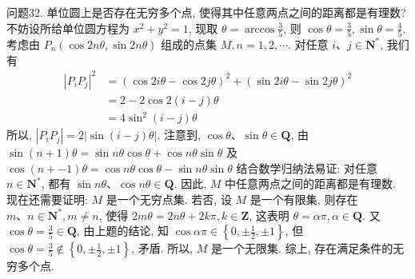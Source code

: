 问题32. 单位圆上是否存在无穷多个点, 使得其中任意两点之间的距离都是有理数?
不妨设所给单位圆方程为 $x^2+y^2=1$, 现取 $\theta=\arccos \frac{3}{5}$, 则 $\cos \theta= \frac{3}{5}, \sin \theta=\frac{4}{5}$. 考虑由 $P_n(\cos 2 n \theta, \sin 2 n \theta)$ 组成的点集 $M, n=1,2, \cdots$.
对任意 $i 、 j \in \mathbf{N}^*$, 我们有
$$
\begin{aligned}
\left|P_i P_j\right|^2 & =(\cos 2 i \theta-\cos 2 j \theta)^2+(\sin 2 i \theta-\sin 2 j \theta)^2 \\
& =2-2 \cos 2(i-j) \theta \\
& =4 \sin ^2(i-j) \theta
\end{aligned}
$$
所以, $\left|P_i P_j\right|=2|\sin (i-j) \theta|$.
注意到, $\cos \theta 、 \sin \theta \in \mathbf{Q}$, 由 $\sin (n+1) \theta=\sin n \theta \cos \theta+\cos n \theta \sin \theta$ 及 $\cos (n+-1) \theta=\cos n \theta \cos \theta-\sin n \theta \sin \theta$ 结合数学归纳法易证: 对任意 $n \in \mathbf{N}^*$, 都有 $\sin n \theta 、 \cos n \theta \in \mathbf{Q}$. 因此, $M$ 中任意两点之间的距离都是有理数.
现在还需要证明: $M$ 是一个无穷点集.
若否, 设 $M$ 是一个有限集, 则存在 $m 、 n \in \mathbf{N}^*, m \neq n$, 使得 $2 m \theta=2 n \theta+ 2 k \pi, k \in \mathbf{Z}$, 这表明 $\theta=\alpha \pi, \alpha \in \mathbf{Q}$. 又 $\cos \theta=\frac{3}{5} \in \mathbf{Q}$, 由上题的结论, 知 $\cos \alpha \pi \in\left\{0, \pm \frac{1}{2}, \pm 1\right\}$, 但 $\cos \theta=\frac{3}{5} \notin\left\{0, \pm \frac{1}{2}, \pm 1\right\}$, 矛盾.
所以, $M$ 是一个无限集.
综上, 存在满足条件的无穷多个点.




